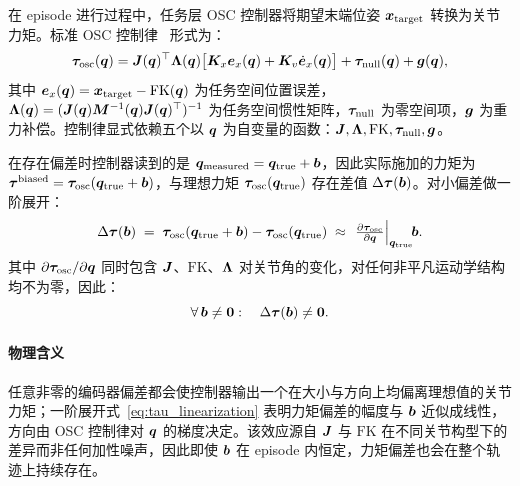 在 episode 进行过程中，任务层 OSC 控制器将期望末端位姿 $\bm{x}_{\text{target}}$ 转换为关节力矩。标准 OSC 控制律~\cite{siciliano2010robotics,ott2008cartesian} 形式为：
\begin{equation}
  \bm{\tau}_{\text{osc}}(\bm{q}) = \bm{J}(\bm{q})^\top \bm{\Lambda}(\bm{q})
    \big[\bm{K}_x \bm{e}_x(\bm{q}) + \bm{K}_v \dot{\bm{e}}_x(\bm{q})\big]
    + \bm{\tau}_{\text{null}}(\bm{q}) + \bm{g}(\bm{q}),
  \label{eq:osc_law}
\end{equation}
其中 $\bm{e}_x(\bm{q}) = \bm{x}_{\text{target}} - \text{FK}(\bm{q})$ 为任务空间位置误差，$\bm{\Lambda}(\bm{q}) = (\bm{J}(\bm{q})\bm{M}^{-1}(\bm{q})\bm{J}(\bm{q})^\top)^{-1}$ 为任务空间惯性矩阵，$\bm{\tau}_{\text{null}}$ 为零空间项，$\bm{g}$ 为重力补偿。控制律显式依赖五个以 $\bm{q}$ 为自变量的函数：$\bm{J}, \bm{\Lambda}, \text{FK}, \bm{\tau}_{\text{null}}, \bm{g}$。

在存在偏差时控制器读到的是 $\bm{q}_{\text{measured}} = \bm{q}_{\text{true}} + \bm{b}$，因此实际施加的力矩为 $\bm{\tau}^{\text{biased}} = \bm{\tau}_{\text{osc}}(\bm{q}_{\text{true}} + \bm{b})$，与理想力矩 $\bm{\tau}_{\text{osc}}(\bm{q}_{\text{true}})$ 存在差值 $\Delta\bm{\tau}(\bm{b})$。对小偏差做一阶展开：
\begin{equation}
  \Delta\bm{\tau}(\bm{b})
  \;=\; \bm{\tau}_{\text{osc}}(\bm{q}_{\text{true}}+\bm{b}) - \bm{\tau}_{\text{osc}}(\bm{q}_{\text{true}})
  \;\approx\; \left.\tfrac{\partial \bm{\tau}_{\text{osc}}}{\partial \bm{q}}\right|_{\bm{q}_{\text{true}}}\!\! \bm{b}.
  \label{eq:tau_linearization}
\end{equation}
其中 $\partial \bm{\tau}_{\text{osc}}/\partial \bm{q}$ 同时包含 $\bm{J}$、$\text{FK}$、$\bm{\Lambda}$ 对关节角的变化，对任何非平凡运动学结构均不为零，因此：
\begin{equation}
  \forall\, \bm{b} \neq \bm{0}: \quad \Delta\bm{\tau}(\bm{b}) \neq \bm{0}.
  \label{eq:effect2}
\end{equation}

\paragraph{物理含义} 任意非零的编码器偏差都会使控制器输出一个在大小与方向上均偏离理想值的关节力矩；一阶展开式~\cref{eq:tau_linearization} 表明力矩偏差的幅度与 $\bm{b}$ 近似成线性，方向由 OSC 控制律对 $\bm{q}$ 的梯度决定。该效应源自 $\bm{J}$ 与 $\text{FK}$ 在不同关节构型下的差异而非任何加性噪声，因此即使 $\bm{b}$ 在 episode 内恒定，力矩偏差也会在整个轨迹上持续存在。

